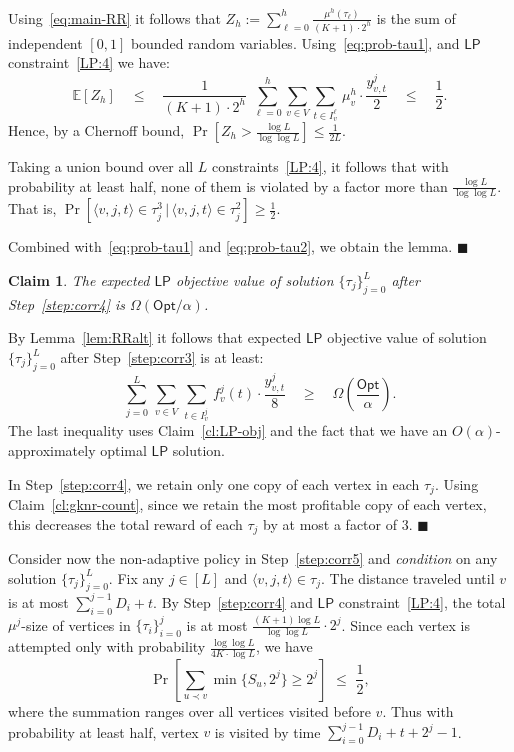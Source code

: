 \documentclass[11pt,letterpaper]{article}
\newtheorem{claim}[theorem]{Claim}
\numberwithin{algorithm}{section}
\newenvironment{proof}{

\noindent{\bf Proof:}}
{\hfill$\blacksquare$


}
\newcommand{\Opt}{\ensuremath{\mathsf{Opt}}\xspace}
\newcommand{\lp}{\ensuremath{\mathsf{LP}}\xspace}
\newcommand{\E}{\mathbb{E}}
\begin{document}
\begin{proof}
Using~\eqref{eq:main-RR} it follows that $Z_h:=\sum_{\ell=0}^h \frac{\mu^h(\tau_\ell)}{(K+1)\cdot 2^h}$ is the sum of independent $[0,1]$ bounded random variables.  Using~\eqref{eq:prob-tau1}, and \lp constraint~\eqref{LP:4} we have:
$$\E[Z_h] \quad \le \quad \frac1{(K+1)\cdot 2^h} \,\,\sum_{\ell=0}^h \sum_{v\in V} \sum_{t\in I^\ell_v} \,\mu^h_v\cdot \frac{y^j_{v,t}}{2} \quad \le \quad \frac12.$$
Hence, by a Chernoff bound, {\small $\Pr\left[Z_h > \frac{\log L}{\log\log L}\right]  \le \frac{1}{2L}$}.

Taking a union bound over all $L$ constraints~\eqref{LP:4}, it follows that with probability at least half, none of them is violated by a factor more than $\frac{\log L}{\log\log L}$. That is, $\Pr\left[\langle v,j,t\rangle \in \tau_j^3 \, |\, \langle v,j,t\rangle \in \tau_j^2\right] \ge \frac12$.

Combined with~\eqref{eq:prob-tau1} and \eqref{eq:prob-tau2}, we obtain the lemma.
\end{proof}


\begin{claim}\label{cl:corr-exp}
The expected \lp objective value of solution $\{\tau_j\}_{j=0}^L$ after Step~\ref{step:corr4} is $\Omega(\Opt/\alpha)$.
\end{claim}
\begin{proof}
By Lemma~\ref{lem:RRalt} it follows that expected \lp objective value of solution $\{\tau_j\}_{j=0}^L$ after Step~\ref{step:corr3} is at least:
{\small $$\sum_{j=0}^L \, \sum_{v \in V}  \, \sum_{t \in I^j_v} \, f^j_v(t)\cdot \frac{y^j_{v,t}}8 \quad \ge\quad \Omega\left(\frac{\Opt}{\alpha}\right).$$}
The last inequality uses Claim~\ref{cl:LP-obj} and the fact that we have an $O(\alpha)$-approximately optimal \lp solution.

In Step~\ref{step:corr4}, we retain only one copy of each vertex in each $\tau_j$. Using Claim~\ref{cl:gknr-count}, since we retain the most profitable copy of each vertex, this decreases the total reward of each $\tau_j$ by at most a factor of $3$. \end{proof}

Consider now the non-adaptive policy in Step~\ref{step:corr5} and {\em condition} on any solution $\{\tau_j\}_{j=0}^L$. Fix any $j\in [L]$ and  $\langle v, j, t\rangle\in \tau_j$. The distance traveled until $v$ is at most $\sum_{i=0}^{j-1}D_i + t$. By Step~\ref{step:corr4} and \lp constraint~\eqref{LP:4}, the total $\mu^j$-size of vertices in $\{\tau_i\}_{i=0}^j$ is at most $\frac{(K+1)\log L}{\log\log L}\cdot 2^j$. Since each vertex is attempted only with probability $\frac{\log\log L}{4K\cdot \log L}$, we have
$$\Pr\left[ \sum_{u\prec v} \min\{S_u,2^j\} \ge 2^j \right]  \,\, \le \,\, \frac12,$$ where the summation ranges over all vertices visited before $v$. Thus with probability at least half, vertex $v$ is visited  by time $\sum_{i=0}^{j-1}D_i + t+2^j-1$.
\end{document}
